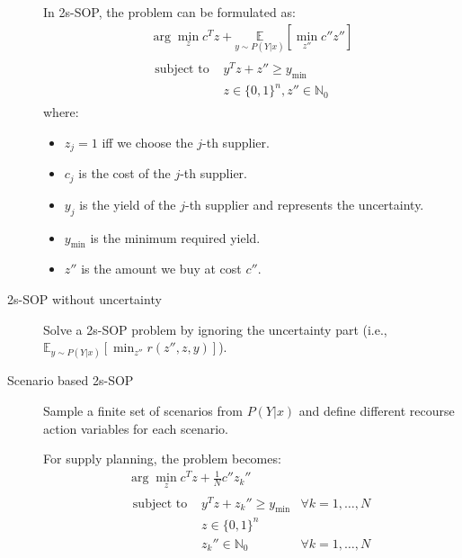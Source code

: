 \begin{description}
\begin{example}
            In 2s-SOP, the problem can be formulated as:
            \[ 
                \begin{gathered}
                    \arg\min_z c^Tz + \underset{y \sim P(Y|x)}{\mathbb{E}}\left[ \min_{z''} c''z'' \right] \\
                    \begin{aligned}
                        \text{subject to } &y^Tz + z'' \geq y_\text{min} \\
                        &z \in \{ 0, 1 \}^n, z'' \in \mathbb{N}_0
                    \end{aligned}
                \end{gathered}
            \]
            where:
            \begin{itemize}
                \item $z_j = 1$ iff we choose the $j$-th supplier.
                \item $c_j$ is the cost of the $j$-th supplier.
                \item $y_j$ is the yield of the $j$-th supplier and represents the uncertainty.
                \item $y_\text{min}$ is the minimum required yield.
                \item $z''$ is the amount we buy at cost $c''$.
            \end{itemize}
        \end{example}


    \item[2s-SOP without uncertainty] 
        Solve a 2s-SOP problem by ignoring the uncertainty part (i.e., $\mathbb{E}_{y \sim P(Y|x)}\left[ \min_{z''} r(z'', z, y) \right]$).


    \item[Scenario based 2s-SOP] 
        Sample a finite set of scenarios from $P(Y | x)$ and define different recourse action variables for each scenario.

        \begin{example}
            For supply planning, the problem becomes:
            \[ 
                \begin{gathered}
                    \arg\min_z c^Tz + \frac{1}{N} c'' z_{k}'' \\
                    \begin{aligned}
                        \text{subject to } &y^Tz + z_{k}'' \geq y_\text{min} & \forall k = 1, \dots, N \\
                        &z \in \{ 0, 1 \}^n \\
                        &z_k'' \in \mathbb{N}_0 & \forall k = 1, \dots, N
                    \end{aligned}
                \end{gathered}
            \]
        \end{example}


\end{description}
